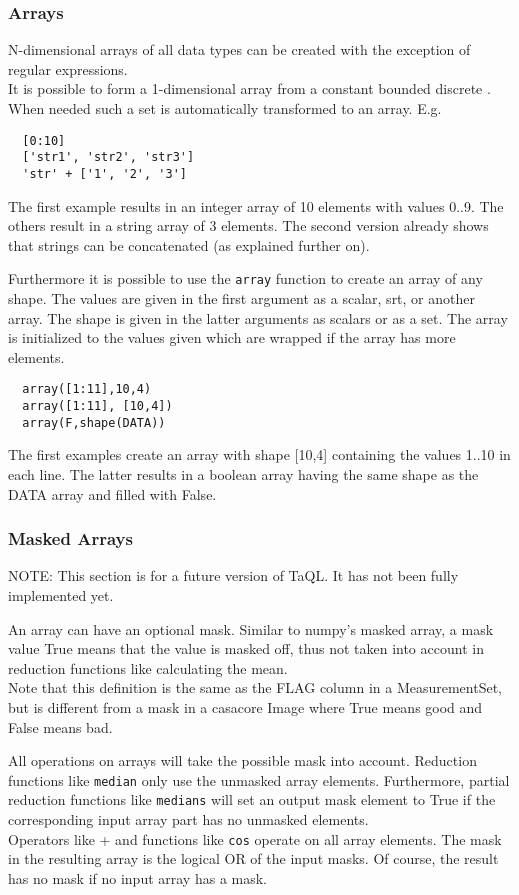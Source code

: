 \subsubsection{Arrays}
N-dimensional arrays of all data types can be created with the
exception of regular expressions. 
\\It is possible to form a 1-dimensional array from a constant bounded discrete
. When needed such a set is automatically
transformed to an array. E.g.
\begin{verbatim}
  [0:10]
  ['str1', 'str2', 'str3']
  'str' + ['1', '2', '3']
\end{verbatim}
The first example results in an integer array of 10 elements with values 0..9.
The others result in a string array of 3 elements. The second version already
shows that strings can be concatenated (as explained further on).

Furthermore it is possible to use the \texttt{array} function to
create an array of any shape. The values are given in the first
argument as a scalar, srt, or another array. The shape is given in the latter
arguments as scalars or as a set. The array is initialized to the
values given which are wrapped if the array has more elements.
\begin{verbatim}
  array([1:11],10,4)
  array([1:11], [10,4])
  array(F,shape(DATA))
\end{verbatim}
The first examples create an array with shape [10,4] containing the values
1..10 in each line.
The latter results in a boolean array having the same
shape as the DATA array and filled with False.

\subsubsection{Masked Arrays}
NOTE: This section is for a future version of TaQL. It has not been fully
implemented yet.

An array can have an optional mask. Similar to numpy's masked
array, a mask value True means that the value is masked off, thus not
taken into account in reduction functions like calculating the mean.
\\Note that this definition is the same as the FLAG column in a
MeasurementSet, but is different from a mask in a casacore Image where
True means good and False means bad.

All operations on arrays will take the possible mask into account.
Reduction functions like \texttt{median} only use
the unmasked array elements. Furthermore, partial reduction functions
like \texttt{medians} will set an output mask element to True if the
corresponding input array part has no unmasked elements.
\\Operators like + and functions like \texttt{cos} operate on all array
elements. The mask in the resulting array is the logical OR of the
input masks. Of course, the result has no mask if no input array has
a mask.

